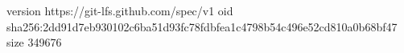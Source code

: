 version https://git-lfs.github.com/spec/v1
oid sha256:2dd91d7eb930102c6ba51d93fc78fdbfea1c4798b54c496e52cd810a0b68bf47
size 349676
